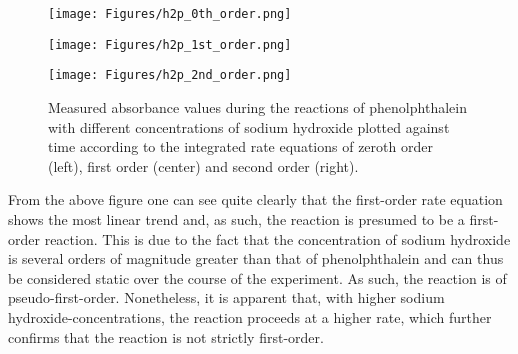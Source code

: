 \documentclass[titlepage]{article}
\begin{document}
\begin{figure}[H]
    \centering
    \begin{minipage}[c]{0.32\textwidth}
        \texttt{[image: Figures/h2p\_0th\_order.png]}
    \end{minipage}
    \begin{minipage}[c]{0.32\textwidth}
        \texttt{[image: Figures/h2p\_1st\_order.png]}
    \end{minipage}
    \begin{minipage}[c]{0.32\textwidth}
        \texttt{[image: Figures/h2p\_2nd\_order.png]}
    \end{minipage}
    \caption{Measured absorbance values during the reactions of phenolphthalein with different concentrations of sodium hydroxide plotted against time according to the integrated rate equations of zeroth order (left), first order (center) and second order (right).}
    \label{fig_h2p_rates}
\end{figure}
%
\noindent From the above figure one can see quite clearly that the first-order rate equation shows the most linear trend and, as such, the reaction is presumed to be a first-order reaction. This is due to the fact that the concentration of sodium hydroxide is several orders of magnitude greater than that of phenolphthalein and can thus be considered static over the course of the experiment. As such, the reaction is of pseudo-first-order. Nonetheless, it is apparent that, with higher sodium hydroxide-concentrations, the reaction proceeds at a higher rate, which further confirms that the reaction is not strictly first-order.
\end{document}

